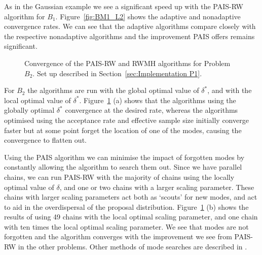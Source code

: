 \documentclass[final]{siamltex}
\begin{document}
As in the Gaussian example we see a significant speed up with the PAIS-RW algorithm for $B_1$. Figure~\ref{fig:BM1_L2} shows the adaptive and nonadaptive convergence rates. We can see that the adaptive algorithms compare closely with the
respective nonadaptive algorithms and the improvement PAIS offers remains significant.

\begin{figure}[htb]
\centering
{}
\caption{Convergence of the PAIS-RW and RWMH algorithms for Problem $B_2$. Set up described in Section~\ref{sec:Implementation P1}.}
\label{fig:BM2_L2}
\end{figure}

For $B_2$ the algorithms are run with the global optimal value of $\delta^*$, and with the local optimal value of $\delta^*$. Figure~\ref{fig:BM2_L2} (a) shows that the algorithms using the globally optimal $\delta^*$ convergence at the desired rate, whereas the algorithms optimised using the acceptance rate and effective sample size initially converge faster but at some point forget the location of one of the modes, causing the convergence to flatten out.

Using the PAIS algorithm we can minimise the impact of forgotten modes by constantly allowing the algorithm to search them out. Since we have parallel chains, we can run PAIS-RW with the majority of chains using the locally optimal value of $\delta$, and one or two chains with a larger scaling parameter. These chains with larger scaling parameters act both as `scouts' for new modes, and act to aid in the overdispersal of the proposal distribution. Figure~\ref{fig:BM2_L2} (b) shows the results of using 49 chains with the local optimal scaling parameter, and one chain with ten times the local optimal scaling parameter. We see that modes are not forgotten and the algorithm converges with the improvement we see from PAIS-RW in the other problems. Other methods of mode searches are described in \cite{lan2013wormhole}.
\end{document}
